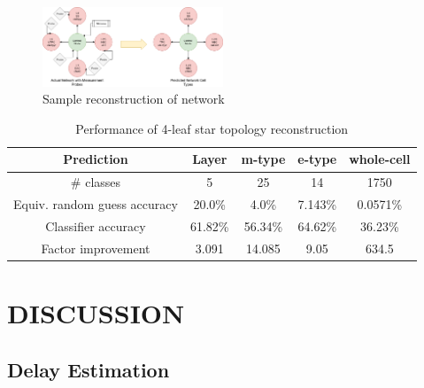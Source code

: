 \documentclass[letterpaper, 10 pt, conference]{ieeeconf}  %
\begin{document}
\begin{figure}[ht]
    \centering
    \includegraphics[width=0.48\textwidth]{4cellTopRecon.png}
    \caption{Sample reconstruction of network}
    \label{fig:4CellRecon}
\end{figure}

\begin{table}[ht]
    \centering
    \begin{tabular}{|c||c|c|c|c|}
        \hline
        Prediction & Layer & m-type & e-type & whole-cell \\
        \hline\hline
        \# classes & 5 & 25 & 14 & 1750\\
        \hline
        Equiv. random guess accuracy & 20.0\% & 4.0\% & 7.143\% & 0.0571\%\\
        \hline
        Classifier accuracy & 61.82\% & 56.34\% & 64.62\% & 36.23\%\\
        \hline
        Factor improvement & 3.091 & 14.085 & 9.05 & 634.5\\
        \hline
    \end{tabular}
    \caption{Performance of 4-leaf star topology reconstruction}
    \label{tbl:wholeClassifierPerf}
\end{table}


\section{DISCUSSION}
\subsection*{Delay Estimation}
\end{document}
